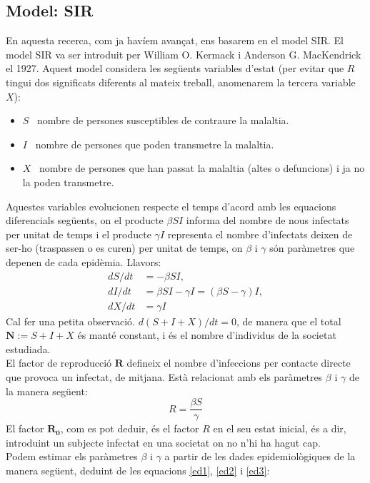 \documentclass[a4paper, 11pt]{article}
\begin{document}
  \subsection{Model: SIR}
  En aquesta recerca, com ja havíem avançat, ens basarem en el model SIR. El model SIR\cite{sir, mora} va ser introduit per William O. Kermack i Anderson G. MacKendrick el 1927. Aquest model considera les següents variables d'estat (per evitar que $R$ tingui dos significats diferents al mateix treball, anomenarem la tercera variable $X$):
  \begin{itemize}
    \item[] $S$ \ nombre de persones susceptibles de contraure la malaltia.
    \item[] $I$ \ nombre de persones que poden transmetre la malaltia.
    \item[] $X$ \ nombre de persones que han passat la malaltia (altes o defuncions) i ja no la poden transmetre.
  \end{itemize}
  Aquestes variables evolucionen respecte el temps d'acord amb les equacions diferencials següents, on el producte $\beta S I$ informa del nombre de nous infectats per unitat de temps i el producte $\gamma I$ representa el nombre d'infectats deixen de ser-ho (traspassen o es curen) per unitat de temps, on $\beta$ i $\gamma$ són paràmetres que depenen de cada epidèmia. Llavors:
  \begin{align}
    \label{ed1} dS/dt &= - \beta S I ,\\
    \label{ed2} dI/dt &= \beta S I - \gamma I = (\beta S - \gamma) I,\\
    \label{ed3} dX/dt &= \gamma I
  \end{align}
  Cal fer una petita observació. $d(S+I+X)/dt = 0$, de manera que el total $\mathbf{N} := S + I + X$ és manté constant, i és el nombre d'individus de la societat estudiada.\\
  El factor de reproducció $\mathbf{R}$ defineix el nombre d'infeccions per contacte directe que provoca un infectat, de mitjana. Està relacionat amb els paràmetres $\beta$ i $\gamma$ de la manera següent: \cite{mora}
  \begin{equation}
    R = \frac{\beta S}{\gamma}
  \end{equation}
  El factor $\mathbf{R_{0}}$, com es pot deduir, és el factor $R$ en el seu estat inicial, és a dir, introduint un subjecte infectat en una societat on no n'hi ha hagut cap.\\
  Podem estimar els paràmetres $\beta$ i $\gamma$ a partir de les dades epidemiològiques de la manera següent, deduint de les equacions \ref{ed1}, \ref{ed2} i \ref{ed3}:
\end{document}
